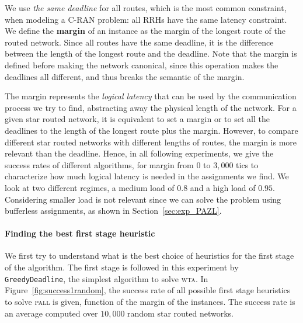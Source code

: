 \documentclass[a4paper,10pt]{journal}
\newcommand\greedydeadline{\texttt{GreedyDeadline}\xspace}
\newcommand\pall{\textsc{pall}\xspace}
\newcommand\wta{\textsc{wta}\xspace}
\begin{document}
    We use \emph{the same deadline} for all routes, which is the most common constraint, when modeling a C-RAN problem: all RRHs have the same latency constraint. We define the {\bf margin} of an instance as the margin of the longest route of the routed network. Since all routes have the same deadline, it is the difference between the length of the longest route and the deadline. Note that the margin is defined before making the network canonical, since this operation makes the deadlines all different, and thus breaks the semantic of the margin.

	The margin represents the \emph{logical latency} that can be used by the communication process we try to find, abstracting away the physical length of the network. For a given star routed network, it is equivalent to set a margin or to set all the deadlines to the length of the longest route plus the margin. However, to compare different star routed networks with different lengths of routes, the margin is more relevant than the deadline. Hence, in all following experiments, we give the success rates of different algorithms, for margin from $0$ to $3,000$ tics to characterize 
    how much logical latency is needed in the assignments we find. We look at two different regimes, a medium load of $0.8$ and a high load of $0.95$. Considering smaller load is not relevant since we can solve the problem using bufferless assignments, as shown in Section~\ref{sec:exp_PAZL}. 


    \paragraph{Finding the best first stage heuristic}
    
   
   	We first try to understand what is the best choice of heuristics for the first stage of the algorithm. The first stage is followed in this experiment by \greedydeadline, the simplest algorithm to solve \wta. In Figure~\ref{fig:success1random}, the success rate of all possible first stage heuristics to solve \pall is given, function of the margin of the instances. The success rate is an average computed over $10,000$ random star routed networks. 
   
\end{document}
